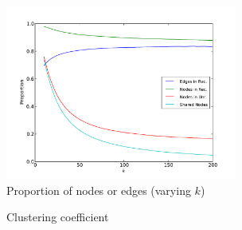 \documentclass[conference]{IEEEtran}
\begin{document}
\begin{figure}[!t]
\centering
\includegraphics[width=3.0in]{proportion_edgesnodes_k}                
\caption{Proportion of nodes or edges (varying $k$)}
\label{fig_rur_propk}
\end{figure}

%

\begin{figure}[!t]
\centering
{}                
\caption{Clustering coefficient}
\label{fig_rur_cc}
\end{figure}

%
\end{document}

